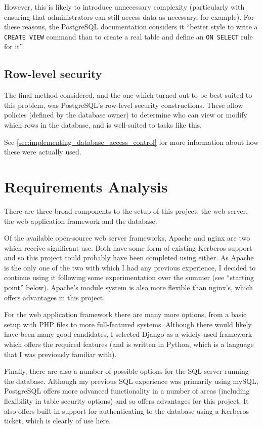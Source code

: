 \documentclass[12pt]{report}
\begin{document}
However, this is likely to introduce unnecessary complexity (particularly with ensuring that administrators can still access data as necessary, for example). For these reasons, the PostgreSQL documentation considers it ``better style to write a \texttt{CREATE VIEW} command than to create a real table and define an \texttt{ON SELECT} rule for it''\cite{postgres-CREATE_RULE}.

\subsection{Row-level security}
The final method considered, and the one which turned out to be best-suited to this problem, was PostgreSQL's row-level security constructions. These allow policies (defined by the database owner) to determine who can view or modify which rows in the database, and is well-suited to tasks like this.

See \autoref{sec:implementing_database_access_control} for more information about how these were actually used.

\section{Requirements Analysis}
There are three broad components to the setup of this project: the web server, the web application framework and the database.

Of the available open-source web server frameworks, Apache and nginx are two which receive significant use. Both have some form of existing Kerberos support and so this project could probably have been completed using either. As Apache is the only one of the two with which I had any previous experience, I decided to continue using it following some experimentation over the summer (see ``starting point'' below). Apache's module system is also more flexible than nginx's, which offers advantages in this project.

For the web application framework there are many more options, from a basic setup with PHP files to more full-featured systems. Although there would likely have been many good candidates, I selected Django as a widely-used framework which offers the required features (and is written in Python, which is a language that I was previously familiar with).

Finally, there are also a number of possible options for the SQL server running the database. Although my previous SQL experience was primarily using mySQL, PostgreSQL offers more advanced functionality in a number of areas (including flexibility in table security options) and so offers advantages for this project. It also offers built-in support for authenticating to the database using a Kerberos ticket, which is clearly of use here.
\end{document}
